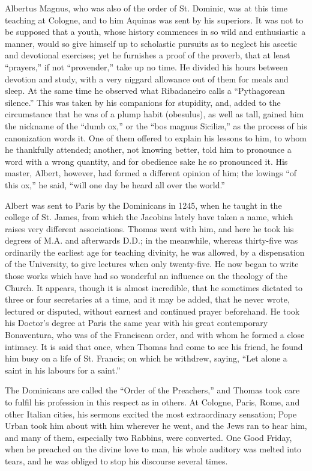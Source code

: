 Albertus Magnus, who was also of the order of St.
Dominic, was at this time teaching at Cologne, and to him Aquinas was
sent by his superiors. It was not to be supposed that a youth, whose
history commences in so wild and enthusiastic a manner, would so give
himself up to scholastic pursuits as to neglect his ascetic and
devotional exercises; yet he furnishes a proof of the proverb, that at
least ``prayers,'' if not ``provender,'' take up no time. He divided his
hours between devotion and study, with a very niggard allowance out of
them for meals and sleep. At the same time he observed what Ribadaneiro
calls a ``Pythagorean silence.'' This was taken by his companions for
stupidity, and, added to the circumstance that he was of a plump habit (obesulus),
as well as tall, gained him the nickname of the ``dumb ox,'' or the ``bos
magnus Siciliæ,'' as the process of his canonization words it. One of
them offered to explain his lessons to him, to whom he thankfully
attended; another, not knowing better, told him to pronounce a word with
a wrong quantity, and for obedience sake he so pronounced it. His
master, Albert, however, had formed a different opinion of him; the
lowings ``of this ox,'' he said, ``will one day be heard all over the
world.''

Albert was sent to Paris by the Dominicans in 1245,
when he taught in the college of St. James, from which the Jacobins
lately have taken a name, which raises very different associations.
Thomas went with him, and here he took his degrees of M.A. and
afterwards D.D.; in the meanwhile, whereas thirty-five was ordinarily
the earliest age for teaching divinity, he was allowed, by a
dispensation of the University, to give lectures when only twenty-five.
He now began to write those works which have had so wonderful an
influence on the theology of the Church. It appears, though it is almost
incredible, that he sometimes dictated to three or four secretaries at a
time, and it may be added, that he never wrote, lectured or disputed,
without earnest and continued prayer beforehand. He took his Doctor's
degree at Paris the same year with his great contemporary Bonaventura,
who was of the Franciscan order, and with whom he formed a close
intimacy. It is said that once, when Thomas had come to see his friend,
he found him busy on a life of St. Francis; on which he withdrew,
saying, ``Let alone a saint in his labours for a saint.''

The Dominicans are called the ``Order of the
Preachers,'' and Thomas took care to fulfil his profession in this
respect as in others. At Cologne, Paris, Rome, and other Italian cities,
his sermons excited the most extraordinary sensation; Pope Urban took
him about with him wherever he went, and the Jews ran to hear him, and
many of them, especially two Rabbins, were converted. One Good Friday,
when he preached on the divine love to man, his whole auditory was
melted into tears, and he was obliged to stop his discourse several
times.

